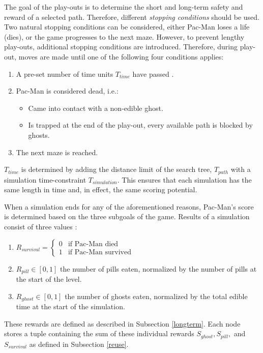 \documentclass[journal]{IEEEtran}
\begin{document}
The goal of the play-outs is to determine the short and long-term safety and reward of a selected path. Therefore, different \emph{stopping conditions} should be used. Two natural stopping conditions can be considered, either Pac-Man loses a life (dies), or the game progresses to the next maze. However, to prevent lengthy play-outs, additional stopping conditions are introduced. Therefore, during play-out, moves are made until one of the following four conditions applies:
\begin{enumerate}
\item A pre-set number of time units $T_{time}$ have passed \cite{ikehata2011monte}.
\item Pac-Man is considered dead, i.e.:
\begin{itemize}
\item Came into contact with a non-edible ghost.
\item Is trapped at the end of the play-out, every available path is blocked by ghosts.
\end{itemize}
\item The next maze is reached.
\end{enumerate}
$T_{time}$ is determined by adding the distance limit of the search tree, $T_{path}$ with a simulation time-constraint $T_{simulation}$. This ensures that each simulation has the same length in time and, in effect, the same scoring potential.

When a simulation ends for any of the aforementioned reasons, Pac-Man's score is determined based on the three subgoals of the game. Results of a simulation consist of three values \cite{ikehata2011monte}:
\begin{enumerate}
\item $R_{survival} =
 \begin{cases}
    0 & \text{if Pac-Man died}\\
    1 & \text{if Pac-Man survived}
  \end{cases}$
\item $R_{pill} \in [0, 1] $ the number of pills eaten, normalized by the number of pills at the start of the level.
\item $R_{ghost} \in [0, 1] $ the number of ghosts eaten, normalized by the total edible time at the start of the simulation.
\end{enumerate}
These rewards are defined as described in Subsection \ref{longterm}. Each node stores a tuple containing the sum of these individual rewards $S_{ghost}, S_{pill},$ and $S_{survival}$ as defined in Subsection \ref{reuse}.
\end{document}
